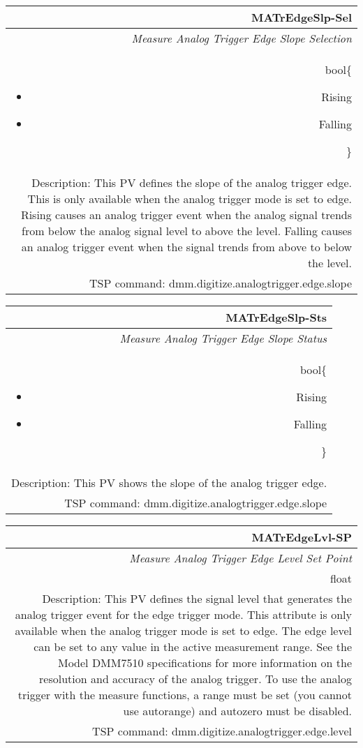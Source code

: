 \documentclass[openany]{article}
\begin{document}
		\begin{tabular}{N}
			\hline
			\bfseries MATrEdgeSlp-Sel\label{pv:matredgeslp-sel} \\ \hline
			\emph{Measure Analog Trigger Edge Slope Selection} \\
			bool\{\begin{itemize}[noitemsep]
				\small
				\item[] Rising
				\item[] Falling
			\end{itemize}\} \\
			Description: This PV defines the slope of the analog trigger edge. This is only available when the analog trigger mode is set to edge. Rising causes an analog trigger event when the analog signal trends from below the analog signal
level to above the level. Falling causes an analog trigger event when the signal trends from above to below the level. \\
			TSP command: dmm.digitize.analogtrigger.edge.slope
		\end{tabular}

		\begin{tabular}{N}
			\hline
			\bfseries MATrEdgeSlp-Sts\label{pv:matredgeslp-sts} \\ \hline
			\emph{Measure Analog Trigger Edge Slope Status} \\
			bool\{\begin{itemize}[noitemsep]
				\small
				\item[] Rising
				\item[] Falling
			\end{itemize}\} \\
			Description: This PV shows the slope of the analog trigger edge. \\
			TSP command: dmm.digitize.analogtrigger.edge.slope
		\end{tabular}

		\begin{tabular}{N}
			\hline
			\bfseries MATrEdgeLvl-SP\label{pv:matredgelvl-sp} \\ \hline
			\emph{Measure Analog Trigger Edge Level Set Point} \\
			float \\
			Description: This PV defines the signal level that generates the analog trigger event for the edge trigger mode. This attribute is only available when the analog trigger mode is set to edge. The edge level can be set to any value in the active measurement range. See the Model DMM7510 specifications for more information on the resolution and accuracy of the analog trigger. To use the analog trigger with the measure functions, a range must be set (you cannot use autorange) and autozero must be disabled. \\
			TSP command: dmm.digitize.analogtrigger.edge.level
		\end{tabular}
\end{document}

